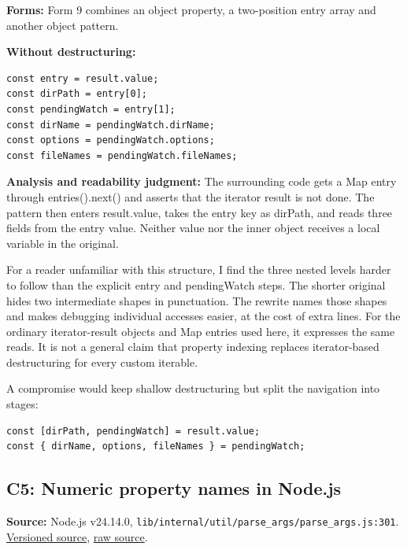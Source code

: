 \documentclass[10pt,a4paper]{article}
\begin{document}
\textbf{Forms:} Form 9 combines an object property, a two-position entry array and another object pattern.


\textbf{Without destructuring:}

\begin{lstlisting}[language=GuideJS]
const entry = result.value;
const dirPath = entry[0];
const pendingWatch = entry[1];
const dirName = pendingWatch.dirName;
const options = pendingWatch.options;
const fileNames = pendingWatch.fileNames;
\end{lstlisting}

\textbf{Analysis and readability judgment:} The surrounding code gets a Map entry through entries().next() and asserts that the iterator result is not done. The pattern then enters result.value, takes the entry key as dirPath, and reads three fields from the entry value. Neither value nor the inner object receives a local variable in the original.

For a reader unfamiliar with this structure, I find the three nested levels harder to follow than the explicit entry and pendingWatch steps. The shorter original hides two intermediate shapes in punctuation. The rewrite names those shapes and makes debugging individual accesses easier, at the cost of extra lines. For the ordinary iterator-result objects and Map entries used here, it expresses the same reads. It is not a general claim that property indexing replaces iterator-based destructuring for every custom iterable.


A compromise would keep shallow destructuring but split the navigation into stages:

\begin{lstlisting}[language=GuideJS]
const [dirPath, pendingWatch] = result.value;
const { dirName, options, fileNames } = pendingWatch;
\end{lstlisting}

\subsection{C5: Numeric property names in Node.js}

\textbf{Source:} Node.js v24.14.0, \texttt{lib/\allowbreak{}internal/\allowbreak{}util/\allowbreak{}parse\_\allowbreak{}args/\allowbreak{}parse\_\allowbreak{}args.\allowbreak{}js:\allowbreak{}301}. \href{https://github.com/nodejs/node/blob/v24.14.0/lib/internal/util/parse\_args/parse\_args.js\#L301}{Versioned source}, \href{https://raw.githubusercontent.com/nodejs/node/v24.14.0/lib/internal/util/parse\_args/parse\_args.js}{raw source}.
\end{document}
